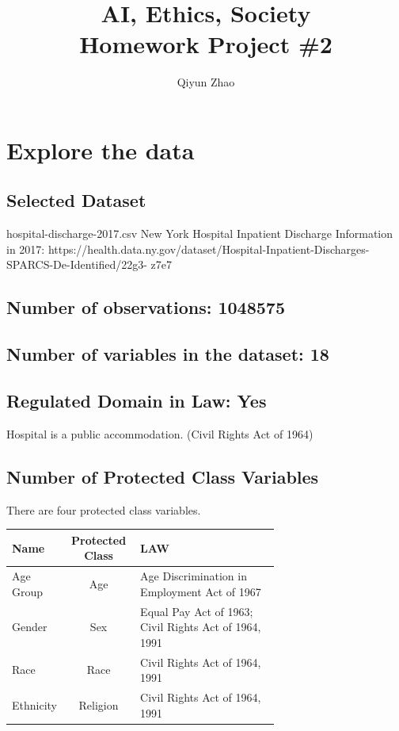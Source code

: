 \documentclass[
	letterpaper, %
]{jdf}
\author{Qiyun Zhao}
\title{AI, Ethics, Society\\Homework Project \#2}
\begin{document}
\maketitle

\section{Explore the data}
\subsection{Selected Dataset}
hospital-discharge-2017.csv \newline
New York Hospital Inpatient Discharge Information in 2017: https://health.data.ny.gov/dataset/Hospital-Inpatient-Discharges-SPARCS-De-Identified/22g3- z7e7
\subsection{Number of observations: 1048575}
\subsection{Number of variables in the dataset: 18}
\subsection{Regulated Domain in Law: Yes}
Hospital is a public accommodation. (Civil Rights Act of 1964)
\subsection{Number of Protected Class Variables}
There are four protected class variables.
\begin{jdftable}
\label{table:Example}
\small %
\begin{tabular}{@{} L{0.15\linewidth} c L{0.52\linewidth}}
\textbf{Name} & \textbf{Protected Class} & \textbf{LAW} \\
	\toprule[0.5pt]
	Age Group & Age & Age Discrimination in Employment Act of 1967\\
	\midrule
	Gender & Sex & Equal Pay Act of 1963; Civil Rights Act of 1964, 1991 \\
	\midrule
	Race &Race & Civil Rights Act of 1964, 1991\\
	\midrule
	Ethnicity & Religion &Civil Rights Act of 1964, 1991\\
\end{tabular}
\end{jdftable}
\end{document}
